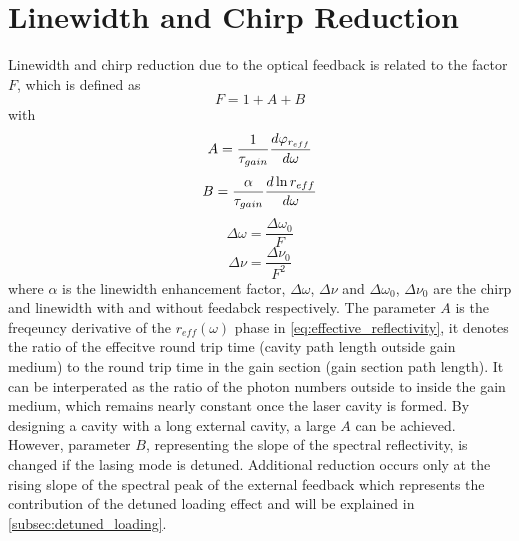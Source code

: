 \section{Linewidth and Chirp Reduction}\label{sec:linewidth_and_chirp_reduction}
Linewidth and chirp reduction due to the optical feedback is related to the factor $F$, which is defined as \cite{kazarinov1987relation}
\begin{equation}
    F=1+A+B
    \label{eq:F_factor}
\end{equation}
with
\begin{equation}
    A=\frac{1}{\tau_{gain}}\dv{\varphi_{r_{eff}}}{\omega}
    \label{eq:F_factor_A}
\end{equation}
\begin{equation}
    B=\frac{\alpha}{\tau_{gain}}\dv{\ln{r_{eff}}}{\omega}
    \label{eq:F_factor_B}
\end{equation}
\begin{equation}
    \Delta\omega=\frac{\Delta\omega_0}{F}
    \label{eq:chirp_reduction}
\end{equation}
\begin{equation}
    \Delta\nu=\frac{\Delta\nu_0}{F^2}
    \label{eq:linewidth_reduction}
\end{equation}
where $\alpha$ is the linewidth enhancement factor, $\Delta\omega$, $\Delta\nu$ and $\Delta\omega_0$, $\Delta\nu_0$ are the chirp and linewidth with and without feedabck respectively. The parameter $A$ is the freqeuncy derivative of the $r_{eff}(\omega)$ phase in \autoref{eq:effective_reflectivity}, it denotes the ratio of the effecitve round trip time (cavity path length outside gain medium) to the round trip time in the gain section (gain section path length). It can be interperated as the ratio of the photon numbers outside to inside the gain medium, which remains nearly constant once the laser cavity is formed. By designing a cavity with a long external cavity, a large $A$ can be achieved. However, parameter $B$, representing the slope of the spectral reflectivity, is changed if the lasing mode is detuned. Additional reduction occurs only at the rising slope of the spectral peak of the external feedback which represents the contribution of the detuned loading effect and will be explained in \autoref{subsec:detuned_loading}.


